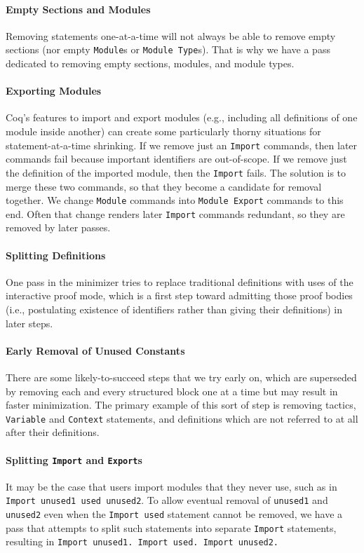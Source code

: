 \documentclass[a4paper,USenglish,cleveref,autoref,thm-restate]{lipics-v2021}
\begin{document}
\paragraph{Empty Sections and Modules}
Removing statements one-at-a-time will not always be able to remove empty sections (nor empty \verb|Module|s or \verb|Module Type|s).
That is why we have a pass dedicated to removing empty sections, modules, and module types.

\paragraph{Exporting Modules}
Coq's features to import and export modules (e.g., including all definitions of one module inside another) can create some particularly thorny situations for statement-at-a-time shrinking.
If we remove just an \verb|Import| commands, then later commands fail because important identifiers are out-of-scope.
If we remove just the definition of the imported module, then the \verb|Import| fails.
The solution is to merge these two commands, so that they become a candidate for removal together.
We change \verb|Module| commands into \verb|Module Export| commands to this end.
Often that change renders later \verb|Import| commands redundant, so they are removed by later passes.

\paragraph{Splitting Definitions}
One pass in the minimizer tries to replace traditional definitions with uses of the interactive proof mode, which is a first step toward admitting those proof bodies (i.e., postulating existence of identifiers rather than giving their definitions) in later steps.

\paragraph{Early Removal of Unused Constants}
There are some likely-to-succeed steps that we try early on, which are superseded by removing each and every structured block one at a time but may result in faster minimization.
The primary example of this sort of step is removing tactics, \verb|Variable| and \verb|Context| statements, and definitions which are not referred to at all after their definitions.

\paragraph{Splitting \texttt{Import} and \texttt{Export}s}
It may be the case that users import modules that they never use, such as in \texttt{Import unused1 used unused2}.
To allow eventual removal of \verb|unused1| and \verb|unused2| even when the \verb|Import used| statement cannot be removed, we have a pass that attempts to split such statements into separate \verb|Import| statements, resulting in \texttt{Import unused1. Import used. Import unused2.}
\end{document}
